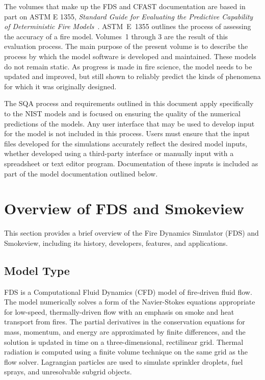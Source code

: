 \documentclass[11pt]{book}
\begin{document}
The volumes that make up the FDS and CFAST documentation are based in part on ASTM E 1355, {\em Standard Guide for Evaluating the Predictive Capability of Deterministic Fire Models}~\cite{ASTM:E1355}. ASTM~E~1355 outlines the process of assessing the accuracy of a fire model. Volumes~1 through 3 are the result of this evaluation process. The main purpose of the present volume is to describe the process by which the model software is developed and maintained. These models do not remain static. As progress is made in fire science, the model needs to be updated and improved, but still shown to reliably predict the kinds of phenomena for which it was originally designed.

The SQA process and requirements outlined in this document apply specifically to the NIST models and is focused on ensuring the quality of the numerical predictions of the models.  Any user interface that may be used to develop input for the model is not included in this process. Users must ensure that the input files developed for the simulations accurately reflect the desired model inputs, whether developed using a third-party interface or manually input with a spreadsheet or text editor program.  Documentation of these inputs is included as part of the model documentation outlined below.

\section{Overview of FDS and Smokeview}

This section provides a brief overview of the Fire Dynamics Simulator (FDS) and Smokeview, including its history, developers, features, and applications.


\subsection{Model Type}

FDS is a Computational Fluid Dynamics (CFD) model of fire-driven fluid flow. The model numerically solves a form of the Navier-Stokes equations
appropriate for low-speed, thermally-driven flow with an emphasis on smoke and heat transport from fires. The partial derivatives in the conservation
equations for mass, momentum, and energy are approximated by finite differences, and the solution is updated in time on a three-dimensional,
rectilinear grid. Thermal radiation is computed using a finite volume technique on the same grid as the flow solver. Lagrangian particles are used to
simulate sprinkler droplets, fuel sprays, and unresolvable subgrid objects.
\end{document}
